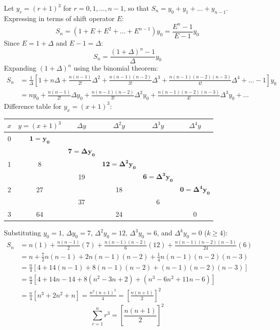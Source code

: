 \documentclass[11pt,a4paper]{article}
\begin{document}
\begin{solbox}
Let $y_r = (r + 1)^3$ for $r = 0, 1, \dots, n-1$, so that $S_n = y_0 + y_1 + \dots + y_{n-1}$.
Expressing in terms of shift operator $E$:
$$S_n = (1 + E + E^2 + \dots + E^{n-1})y_0 = \frac{E^n - 1}{E - 1}y_0$$
Since $E = 1 + \Delta$ and $E - 1 = \Delta$:
$$S_n = \frac{(1 + \Delta)^n - 1}{\Delta} y_0$$
Expanding $(1 + \Delta)^n$ using the binomial theorem:
\begin{align*}
    S_n &= \frac{1}{\Delta}\left[ 1 + n\Delta + \frac{n(n-1)}{2!}\Delta^2 + \frac{n(n-1)(n-2)}{3!}\Delta^3 + \frac{n(n-1)(n-2)(n-3)}{4!}\Delta^4 + \dots - 1 \right] y_0 \\
    &= n y_0 + \frac{n(n-1)}{2!}\Delta y_0 + \frac{n(n-1)(n-2)}{3!}\Delta^2 y_0 + \frac{n(n-1)(n-2)(n-3)}{4!}\Delta^3 y_0 + \dots
\end{align*}
Difference table for $y_x = (x+1)^3$:
\begin{center}
\begin{tabular}{c|ccccc}
    \toprule
    $x$ & $y = (x+1)^3$ & $\Delta y$ & $\Delta^2 y$ & $\Delta^3 y$ & $\Delta^4 y$ \\
    \midrule
    0 & $\mathbf{1 = y_0}$ & & & & \\
    & & $\mathbf{7 = \Delta y_0}$ & & & \\
    1 & 8 & & $\mathbf{12 = \Delta^2 y_0}$ & & \\
    & & 19 & & $\mathbf{6 = \Delta^3 y_0}$ & \\
    2 & 27 & & 18 & & $\mathbf{0 = \Delta^4 y_0}$ \\
    & & 37 & & 6 & \\
    3 & 64 & & 24 & & 0 \\
    \bottomrule
\end{tabular}
\end{center}
Substituting $y_0 = 1$, $\Delta y_0 = 7$, $\Delta^2 y_0 = 12$, $\Delta^3 y_0 = 6$, and $\Delta^k y_0 = 0$ ($k \ge 4$):
\begin{align*}
    S_n &= n(1) + \frac{n(n-1)}{2}(7) + \frac{n(n-1)(n-2)}{6}(12) + \frac{n(n-1)(n-2)(n-3)}{24}(6) \\
    &= n + \frac{7}{2}n(n-1) + 2n(n-1)(n-2) + \frac{1}{4}n(n-1)(n-2)(n-3) \\
    &= \frac{n}{4}\left[ 4 + 14(n-1) + 8(n-1)(n-2) + (n-1)(n-2)(n-3) \right] \\
    &= \frac{n}{4}\left[ 4 + 14n - 14 + 8(n^2 - 3n + 2) + (n^3 - 6n^2 + 11n - 6) \right] \\
    &= \frac{n}{4}\left[ n^3 + 2n^2 + n \right] = \frac{n^2(n+1)^2}{4} = \left[\frac{n(n+1)}{2}\right]^2
\end{align*}
\begin{equation}
    \boxed{\sum_{r=1}^n r^3 = \left[\frac{n(n+1)}{2}\right]^2}
\end{equation}
\end{solbox}
\end{document}
